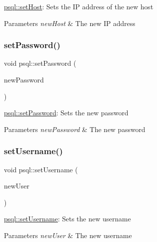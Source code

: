 \mbox{\hyperlink{classpsql_a96b3b9483f1a642c026d4b5cf505eb75}{psql\+::set\+Host}}\+: Sets the IP address of the new host 


\begin{DoxyParams}{Parameters}
{\em new\+Host} & The new IP address \\
\hline
\end{DoxyParams}
\mbox{\label{classpsql_a6c29350037550b7e5a5bb8f439c405f3}} 
\subsubsection{\texorpdfstring{set\+Password()}{setPassword()}}
{\footnotesize\ttfamily void psql\+::set\+Password (\begin{DoxyParamCaption}\item[{Q\+String}]{new\+Password }\end{DoxyParamCaption})}



\mbox{\hyperlink{classpsql_a6c29350037550b7e5a5bb8f439c405f3}{psql\+::set\+Password}}\+: Sets the new password 


\begin{DoxyParams}{Parameters}
{\em new\+Password} & The new password \\
\hline
\end{DoxyParams}
\mbox{\label{classpsql_a1488a9e4909abd172651b7be240342cb}} 
\subsubsection{\texorpdfstring{set\+Username()}{setUsername()}}
{\footnotesize\ttfamily void psql\+::set\+Username (\begin{DoxyParamCaption}\item[{Q\+String}]{new\+User }\end{DoxyParamCaption})}



\mbox{\hyperlink{classpsql_a1488a9e4909abd172651b7be240342cb}{psql\+::set\+Username}}\+: Sets the new username 


\begin{DoxyParams}{Parameters}
{\em new\+User} & The new username \\
\hline
\end{DoxyParams}
\mbox{\label{classpsql_a117b616053845f1b7295b21a06f008fd}} 
